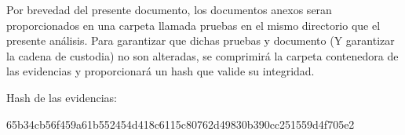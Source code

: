 Por brevedad del presente documento, los documentos anexos seran proporcionados en una carpeta llamada pruebas en el mismo directorio que el presente análisis.
Para garantizar que dichas pruebas y documento (Y garantizar la cadena de custodia) no son alteradas, se comprimirá la carpeta contenedora de las evidencias y proporcionará un hash \cite{hash} que valide su integridad.

Hash de las evidencias:

65b34cb56f459a61b552454d418c6115c80762d49830b390cc251559d4f705e2 
